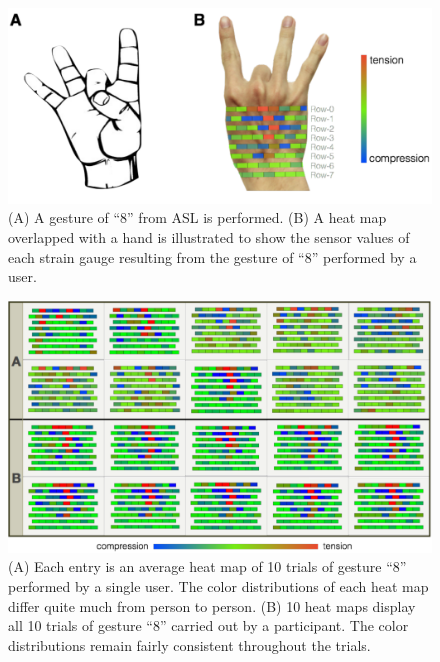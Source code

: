 \documentclass{sigchi}
\begin{document}
\begin{figure}
 \begin{center}
  \includegraphics[width=0.9\columnwidth]{figures/Num8GestureV4.pdf}
  \caption{
    (A) A gesture of ``8'' from ASL is performed.
    (B) A heat map overlapped with a hand is illustrated to show the sensor values of each strain gauge resulting from the gesture of ``8'' performed by a user.
  }
  \label{fig:Num8Gesture}
  \end{center}
\end{figure}

\begin{figure}
 \begin{center}
  \includegraphics[width=1\columnwidth]{figures/SVisualNew_v3.pdf}
  \caption{
    (A) Each entry is an average heat map of 10 trials of gesture ``8'' performed by a single user. The color distributions of each heat map differ quite much from person to person.
    (B) 10 heat maps display all 10 trials of gesture ``8'' carried out by a participant. The color distributions remain fairly consistent throughout the trials.
  }
  \label{fig:SVisualNew}
  \end{center}
\end{figure}
\end{document}
